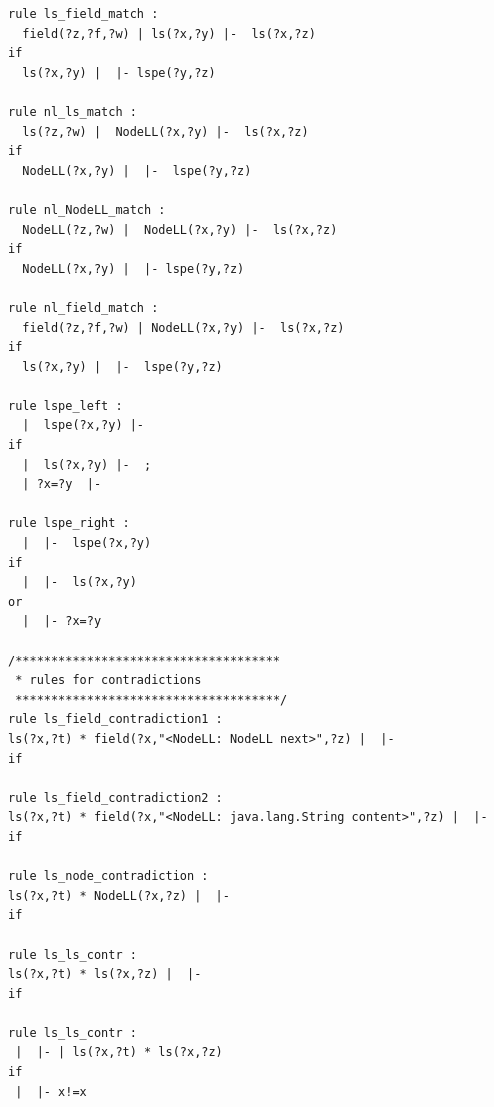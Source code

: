 \documentclass[11pt]{article}
\begin{document}
\begin{verbatim}
rule ls_field_match :
  field(?z,?f,?w) | ls(?x,?y) |-  ls(?x,?z)
if
  ls(?x,?y) |  |- lspe(?y,?z)

rule nl_ls_match :
  ls(?z,?w) |  NodeLL(?x,?y) |-  ls(?x,?z)
if
  NodeLL(?x,?y) |  |-  lspe(?y,?z)

rule nl_NodeLL_match :
  NodeLL(?z,?w) |  NodeLL(?x,?y) |-  ls(?x,?z)
if
  NodeLL(?x,?y) |  |- lspe(?y,?z)

rule nl_field_match :
  field(?z,?f,?w) | NodeLL(?x,?y) |-  ls(?x,?z)
if
  ls(?x,?y) |  |-  lspe(?y,?z)

rule lspe_left :
  |  lspe(?x,?y) |-  
if
  |  ls(?x,?y) |-  ;
  | ?x=?y  |-  

rule lspe_right :
  |  |-  lspe(?x,?y) 
if
  |  |-  ls(?x,?y) 
or
  |  |- ?x=?y  

/*************************************
 * rules for contradictions 
 *************************************/
rule ls_field_contradiction1 :
ls(?x,?t) * field(?x,"<NodeLL: NodeLL next>",?z) |  |-  
if

rule ls_field_contradiction2 :
ls(?x,?t) * field(?x,"<NodeLL: java.lang.String content>",?z) |  |-  
if

rule ls_node_contradiction :
ls(?x,?t) * NodeLL(?x,?z) |  |-  
if

rule ls_ls_contr :
ls(?x,?t) * ls(?x,?z) |  |- 
if

rule ls_ls_contr :
 |  |- | ls(?x,?t) * ls(?x,?z)
if
 |  |- x!=x 
\end{verbatim}
\end{document}
